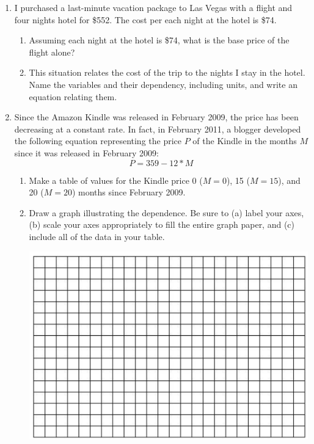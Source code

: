 \documentclass[12pt]{article}
\begin{document}
\begin{enumerate}
\item I purchased a last-minute vacation package to Las Vegas with a flight and four nights hotel for \$552.  The cost per each night at the hotel is \$74.  

\begin{enumerate}
\item Assuming each night at the hotel is \$74, what is the base price of the flight alone?
\vfill

\item This situation relates the cost of the trip to the nights I stay in the hotel. Name the variables and their dependency, including units, and write an equation relating them.
\vfill
\vfill
\end{enumerate}
\newpage %
\item Since the Amazon Kindle was released in February 2009, the price has been decreasing at a constant rate.  In fact, in February 2011, a blogger developed the following equation representing the price $P$ of the Kindle in the months $M$ since it was released in February 2009: $$ P = 359 - 12*  M $$

\begin{enumerate}
\item Make a table of values for the Kindle price 0 ($M=0$), 15 ($M=15$), and 20 ($M=20$) months since February 2009.
\vfill
\item Draw a graph illustrating the dependence.  Be sure to (a) label your axes, (b) scale your axes appropriately to fill the entire graph paper, and (c) include all of the data in your table.

\begin{center}
 {\includegraphics [width = 6in] {../graphPaper}}
\end{center}
\vspace{.1in}


\end{enumerate}
\end{enumerate}
\end{document}
